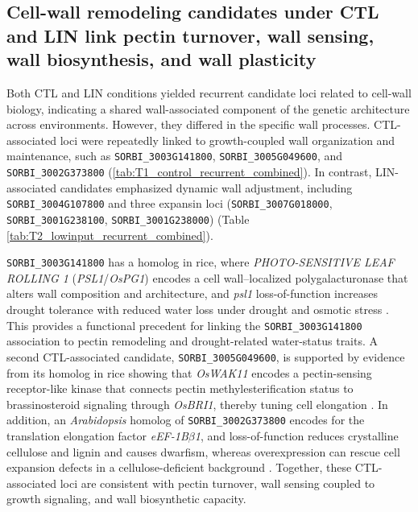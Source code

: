 \documentclass[9pt,twocolumn,twoside]{rilabRxiv}
\begin{document}
\subsection{Cell-wall remodeling candidates under CTL and LIN link pectin turnover, wall sensing, wall biosynthesis, and wall plasticity}

Both CTL and LIN conditions yielded recurrent candidate loci related to cell-wall biology, indicating a shared wall-associated component of the genetic architecture across environments. However, they differed in the specific wall processes. CTL-associated loci were repeatedly linked to growth-coupled wall organization and maintenance, such as \texttt{SORBI\_3003G141800}, \texttt{SORBI\_3005G049600}, and \texttt{SORBI\_3002G373800} (\ref{tab:T1_control_recurrent_combined}). In contrast, LIN-associated candidates emphasized dynamic wall adjustment, including \texttt{SORBI\_3004G107800} and three expansin loci (\texttt{SORBI\_3007G018000}, \texttt{SORBI\_3001G238100}, \texttt{SORBI\_3001G238000}) \citep{Gladman2022SorghumBase} (Table \ref{tab:T2_lowinput_recurrent_combined}).

\texttt{SORBI\_3003G141800} has a homolog in rice, where \textit{PHOTO-SENSITIVE LEAF ROLLING 1} (\textit{PSL1}/\textit{OsPG1}) encodes a cell wall--localized polygalacturonase that alters wall composition and architecture, and \textit{psl1} loss-of-function increases drought tolerance with reduced water loss under drought and osmotic stress \citep{Zhang2021PSL1}. This provides a functional precedent for linking the \texttt{SORBI\_3003G141800} association to pectin remodeling and drought-related water-status traits. A second CTL-associated candidate, \texttt{SORBI\_3005G049600}, is supported by evidence from its homolog in rice showing that \textit{OsWAK11} encodes a pectin-sensing receptor-like kinase that connects pectin methylesterification status to brassinosteroid signaling through \textit{OsBRI1}, thereby tuning cell elongation \citep{Yue2022OsWAK11}. In addition, an \emph{Arabidopsis} homolog of \texttt{SORBI\_3002G373800} encodes for the translation elongation factor \textit{eEF-1B$\beta$1}, and loss-of-function reduces crystalline cellulose and lignin and causes dwarfism, whereas overexpression can rescue cell expansion defects in a cellulose-deficient background \citep{Hossain2012EF1Bb1}. Together, these CTL-associated loci are consistent with pectin turnover, wall sensing coupled to growth signaling, and wall biosynthetic capacity.
\end{document}
